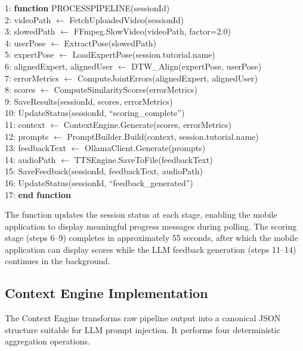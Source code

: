 \begin{sloppypar}
1: \textbf{function} PROCESSPIPELINE(sessionId)\\
2: \quad videoPath $\leftarrow$ FetchUploadedVideo(sessionId)\\
3: \quad slowedPath $\leftarrow$ FFmpeg.SlowVideo(videoPath, factor=2.0)\\
4: \quad userPose $\leftarrow$ ExtractPose(slowedPath)\\
5: \quad expertPose $\leftarrow$ LoadExpertPose(session.tutorial.name)\\
6: \quad alignedExpert, alignedUser $\leftarrow$ DTW\_Align(expertPose, userPose)\\
7: \quad errorMetrics $\leftarrow$ ComputeJointErrors(alignedExpert, alignedUser)\\
8: \quad scores $\leftarrow$ ComputeSimilarityScores(errorMetrics)\\
9: \quad SaveResults(sessionId, scores, errorMetrics)\\
10: \quad UpdateStatus(sessionId, ``scoring\_complete'')\\
11: \quad context $\leftarrow$ ContextEngine.Generate(scores, errorMetrics)\\
12: \quad prompts $\leftarrow$ PromptBuilder.Build(context, session.tutorial.name)\\
13: \quad feedbackText $\leftarrow$ OllamaClient.Generate(prompts)\\
14: \quad audioPath $\leftarrow$ TTSEngine.SaveToFile(feedbackText)\\
15: \quad SaveFeedback(sessionId, feedbackText, audioPath)\\
16: \quad UpdateStatus(sessionId, ``feedback\_generated'')\\
17: \textbf{end function}
\algofooter

The function updates the session status at each stage, enabling the mobile application to display meaningful progress messages during polling. The scoring stage (steps 6--9) completes in approximately 55 seconds, after which the mobile application can display scores while the LLM feedback generation (steps 11--14) continues in the background.

\subsection{Context Engine Implementation}

The Context Engine transforms raw pipeline output into a canonical JSON structure suitable for LLM prompt injection. It performs four deterministic aggregation operations.


\end{sloppypar}
